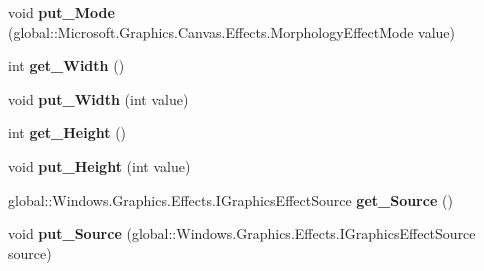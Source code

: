 \begin{DoxyCompactItemize}
\item 
\mbox{\label{class_microsoft_1_1_graphics_1_1_canvas_1_1_effects_1_1_morphology_effect_a296213a0672d2738d42d1fa293d9dd00}} 
void {\bfseries put\+\_\+\+Mode} (global\+::\+Microsoft.\+Graphics.\+Canvas.\+Effects.\+Morphology\+Effect\+Mode value)
\item 
\mbox{\label{class_microsoft_1_1_graphics_1_1_canvas_1_1_effects_1_1_morphology_effect_a6f97be0b87a082ba8cb4b9ebc4f89d70}} 
int {\bfseries get\+\_\+\+Width} ()
\item 
\mbox{\label{class_microsoft_1_1_graphics_1_1_canvas_1_1_effects_1_1_morphology_effect_ac3f128cf3f9dcffa2e7ed06b0a827404}} 
void {\bfseries put\+\_\+\+Width} (int value)
\item 
\mbox{\label{class_microsoft_1_1_graphics_1_1_canvas_1_1_effects_1_1_morphology_effect_abcfe446fe92397d1c11d0b6227c48e3e}} 
int {\bfseries get\+\_\+\+Height} ()
\item 
\mbox{\label{class_microsoft_1_1_graphics_1_1_canvas_1_1_effects_1_1_morphology_effect_a8952cddc9fba06db55a0f9b692f3a53d}} 
void {\bfseries put\+\_\+\+Height} (int value)
\item 
\mbox{\label{class_microsoft_1_1_graphics_1_1_canvas_1_1_effects_1_1_morphology_effect_a3a2a845c602a6a0210a1eec2fde425ce}} 
global\+::\+Windows.\+Graphics.\+Effects.\+I\+Graphics\+Effect\+Source {\bfseries get\+\_\+\+Source} ()
\item 
\mbox{\label{class_microsoft_1_1_graphics_1_1_canvas_1_1_effects_1_1_morphology_effect_ae949c76c82e06342011eb1752f181098}} 
void {\bfseries put\+\_\+\+Source} (global\+::\+Windows.\+Graphics.\+Effects.\+I\+Graphics\+Effect\+Source source)
\item 
\mbox{\label{class_microsoft_1_1_graphics_1_1_canvas_1_1_effects_1_1_morphology_effect_a77f71f5925758effa265f4eeeb2f6f4a}} 

\end{DoxyCompactItemize}
